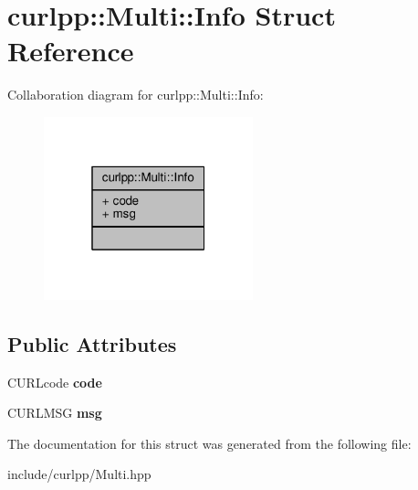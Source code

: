 \hypertarget{structcurlpp_1_1Multi_1_1Info}{\section{curlpp\-:\-:Multi\-:\-:Info Struct Reference}
\label{structcurlpp_1_1Multi_1_1Info}
}


Collaboration diagram for curlpp\-:\-:Multi\-:\-:Info\-:\nopagebreak
\begin{figure}[H]
\begin{center}
\leavevmode
\includegraphics[width=172pt]{structcurlpp_1_1Multi_1_1Info__coll__graph}
\end{center}
\end{figure}
\subsection*{Public Attributes}
\begin{DoxyCompactItemize}
\item 
\hypertarget{structcurlpp_1_1Multi_1_1Info_a6ac2375e6150dd23ee4a8037699f815d}{C\-U\-R\-Lcode {\bfseries code}}\label{structcurlpp_1_1Multi_1_1Info_a6ac2375e6150dd23ee4a8037699f815d}

\item 
\hypertarget{structcurlpp_1_1Multi_1_1Info_ae15bbac2e293851e9d47751dda8725af}{C\-U\-R\-L\-M\-S\-G {\bfseries msg}}\label{structcurlpp_1_1Multi_1_1Info_ae15bbac2e293851e9d47751dda8725af}

\end{DoxyCompactItemize}


The documentation for this struct was generated from the following file\-:\begin{DoxyCompactItemize}
\item 
include/curlpp/Multi.\-hpp\end{DoxyCompactItemize}

